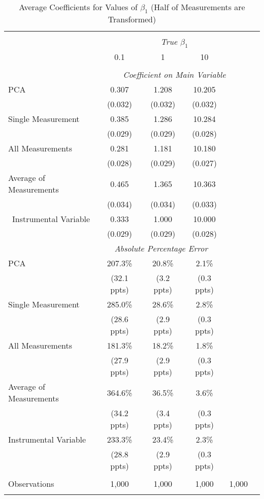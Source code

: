 \begin{table}[!htbp] \centering
  \caption{Average Coefficients for Values of $\beta_1$ (Half of Measurements are Transformed)\label{sim_beta1_5_exp}}
\begin{tabular}{@{\extracolsep{5pt}}lccccc}
\\[-1.8ex]\hline
\hline \\[-1.8ex]
& \multicolumn{4}{c}{\textit{True $\beta_1$}} \
\cr \
\\[-1.8ex] & 0.1 & 1 & 10\\
\hline \\[-1.8ex]
& \multicolumn{4}{c}{\textit{Coefficient on Main Variable}} \\
 PCA & 0.307 & 1.208 & 10.205  \\
  & (0.032) & (0.032) & (0.032)\\
  Single Measurement & 0.385 & 1.286 & 10.284  \\
& (0.029) & (0.029) & (0.028)\\
 All Measurements & 0.281 & 1.181 & 10.180  \\
  & (0.028) & (0.029) & (0.027)\\
 Average of Measurements & 0.465 & 1.365 & 10.363  \\
  & (0.034) & (0.034) & (0.033)\\\
  Instrumental Variable & 0.333 & 1.000 & 10.000 \\
& (0.029) & (0.029) & (0.028) \\
& \multicolumn{3}{c}{\textit{Absolute Percentage Error}} \\
  PCA & 207.3\% & 20.8\% & 2.1\%  \\
   & (32.1 ppts) & (3.2 ppts) & (0.3 ppts)\\
   Single Measurement & 285.0\% & 28.6\% & 2.8\%  \\
& (28.6 ppts) & (2.9 ppts) & (0.3 ppts) \\
All Measurements & 181.3\% & 18.2\% & 1.8\%  \\
  & (27.9 ppts) & (2.9 ppts) & (0.3 ppts)\\
  Average of Measurements & 364.6\% & 36.5\% & 3.6\%  \\
  & (34.2 ppts) & (3.4 ppts) & (0.3 ppts)\\
  Instrumental Variable & 233.3\% & 23.4\% & 2.3\%  \\
& (28.8 ppts) & (2.9 ppts) & (0.3 ppts)\\

\hline \\[-1.8ex]
 Observations & 1,000 & 1,000 & 1,000 & 1,000 &\\
\hline
\hline \\[-1.8ex]
\end{tabular}
\end{table}